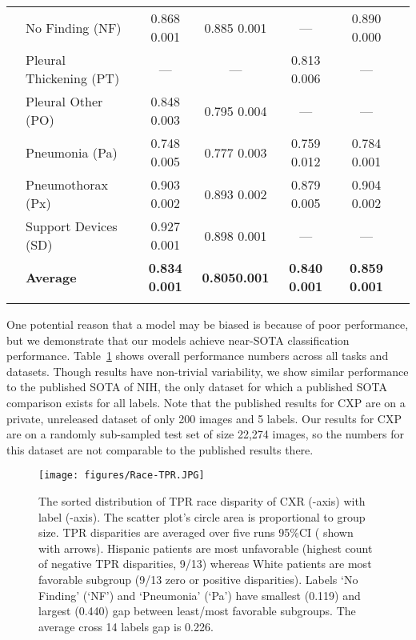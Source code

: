 \documentclass{ws-procs11x85}
\begin{document}
\begin{table}[h]
{\begin{tabular}{@{}llccccc@{}}
& No Finding (NF)         & 0.868   0.001         & 0.885    0.001    & --- &  0.890    0.000 \\
& Pleural Thickening (PT) & ---                        & ---                    & 0.813   0.006 & ---\\
& Pleural Other (PO)      & 0.848   0.003         & 0.795    0.004    & --- & --- \\
& Pneumonia (Pa)          & 0.748   0.005         & 0.777    0.003    & 0.759    0.012  & 0.784    0.001\\
& Pneumothorax (Px)       & 0.903   0.002         & 0.893    0.002    & 0.879    0.005 & 0.904  0.002 \\
& Support Devices (SD)    & 0.927   0.001         & 0.898    0.001    & --- & --- \\ \colrule
& \textbf{Average}        & \textbf{0.834  0.001} &\textbf{0.8050.001}&  \textbf{0.840  0.001} & \textbf{0.859  0.001}\\ 
 \botrule
\end{tabular}}\label{Table:Acc}
\end{table}

One potential reason that a model may be biased is because of poor performance, but we demonstrate that our models achieve near-SOTA classification performance. Table~\ref{Table:Acc} shows overall performance numbers across all tasks and datasets. Though results have non-trivial variability, we show similar performance to the published SOTA of NIH,\cite{rajpurkar_deep_2018} the only dataset for which a published SOTA comparison exists for all labels. Note that the published results for CXP\cite{irvin_chexpert:_2019} are on a private, unreleased dataset of only 200 images and 5 labels. Our results for CXP are on a randomly sub-sampled test set of size 22,274 images, so the numbers for this dataset are not comparable to the published results there.


 
\begin{figure*}[!htb]
    \centering
       \texttt{[image: figures/Race-TPR.JPG]}  
         \caption{
         The sorted distribution of TPR race disparity of CXR (-axis) with label (-axis). The scatter plot's circle area is proportional to group size. TPR disparities are averaged over five runs 95\%CI (
shown with arrows). Hispanic patients are most unfavorable (highest count of negative TPR disparities, 9/13) whereas White patients are most favorable subgroup (9/13 zero or positive disparities). Labels `No Finding' (`NF') and `Pneumonia' (`Pa') have smallest (0.119) and largest (0.440) gap  between  least/most favorable subgroups. The average cross 14 labels gap is 0.226.}
       \label{MIMICRaceAll}
 \end{figure*} 
\end{document}

